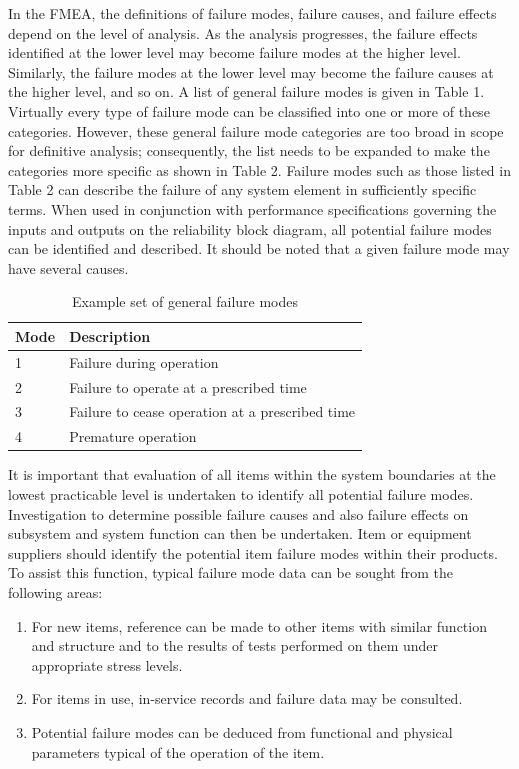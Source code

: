 \documentclass[./dissertation.tex]{subfiles}
\begin{document}
In the FMEA, the definitions of failure modes, failure causes, and failure effects depend on the level of analysis. As the analysis progresses, the failure effects identified at the lower level may become failure modes at the higher level. Similarly, the failure modes at the lower level may become the failure causes at the higher level, and so on. A list of general failure modes is given in Table 1. Virtually every type of failure mode can be classified into one or more of these categories. However, these general failure mode categories are too broad in scope for definitive analysis; consequently, the list needs to be expanded to make the categories more specific as shown in Table 2. Failure modes such as those listed in Table 2 can describe the failure of any system element in sufficiently specific terms. When used in conjunction with performance specifications governing the inputs and outputs on the reliability block diagram, all potential failure modes can be identified and described. It should be noted that a given failure mode may have several causes.

\begin{table}[H]
\centering
\caption{Example set of general failure modes}
\label{tab:failure-modes}
\begin{tabular}{ll}
\hline
\textbf{Mode} & \textbf{Description} \\
\hline
1 & Failure during operation \\
\hline
2 & Failure to operate at a prescribed time \\
\hline
3 & Failure to cease operation at a prescribed time \\
\hline
4 & Premature operation \\
\hline
\end{tabular}
\end{table}

It is important that evaluation of all items within the system boundaries at the lowest practicable level is undertaken to identify all potential failure modes. Investigation to determine possible failure causes and also failure effects on subsystem and system function can then be undertaken. Item or equipment suppliers should identify the potential item failure modes within their products. To assist this function, typical failure mode data can be sought from the following areas:

\begin{enumerate}
\item For new items, reference can be made to other items with similar function and structure and to the results of tests performed on them under appropriate stress levels.
\item For items in use, in-service records and failure data may be consulted.
\item Potential failure modes can be deduced from functional and physical parameters typical of the operation of the item.
\end{enumerate}
\end{document}
